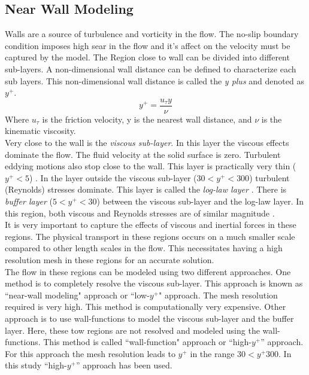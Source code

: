 \subsection{Near Wall Modeling}\label{PrismLayer}
Walls are a source of turbulence and vorticity in the flow. The no-slip boundary condition imposes high sear in the flow and it's affect on the velocity must be captured by the model. The Region close to wall can be divided into different sub-layers. A non-dimensional wall distance can be defined to characterize each sub layers. This non-dimensional wall distance is called the \textit{y plus} and denoted as $y^+$.
\begin{equation}
y^+ = \frac{u_\tau y}{\nu} \label{y plus}
\end{equation}
Where $u_\tau$ is the friction velocity, y is the nearest wall distance, and $\nu$ is the kinematic viscosity.\\
 Very close to the wall is the \textit{viscous sub-layer}. In this layer the viscous effects dominate the flow. The fluid velocity at the solid surface is zero. Turbulent eddying motions also stop close to the wall. This layer is practically very thin ($y^+ < 5$) \cite{Reference8}. In the layer outside the viscous sub-layer ($30 < y^+ < 300$) turbulent (Reynolds) stresses dominate. This layer is called the \textit{log-law layer} \cite{Reference8}. There is \textit{buffer layer} ($5 < y^+ < 30$) between the viscous sub-layer and the log-law layer. In this region, both viscous and Reynolds stresses are of similar magnitude \cite{Reference8}.\\
It is very important to capture the effects of viscous and inertial forces in these regions. The physical transport in these regions occurs on a much smaller scale compared to other length scales in the flow. This necessitates having a high resolution mesh in these regions for an accurate solution.\\
The flow in these regions can be modeled using two different approaches. One method is to completely resolve the viscous sub-layer. This approach is known as ``near-wall modeling" approach or ``low-$y^+$" approach. The mesh resolution required is very high. This method is computationally very expensive. Other approach is to use wall-functions to model the viscous sub-layer and the buffer layer. Here, these tow regions are not resolved and modeled using the wall-functions. This method is called ``wall-function" approach or ``high-$y^+$'' approach. For this approach the mesh resolution leads to $y^+$ in the range $30< y^+ 300$. In this study ``high-$y^+$'' approach has been used.\\

